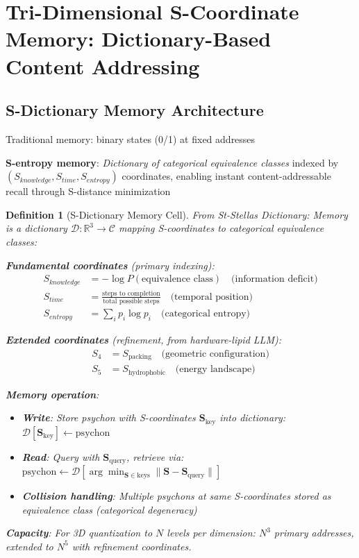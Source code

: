 \documentclass[11pt,a4paper]{article}
\newtheorem{definition}{Definition}[section]
\begin{document}
\section{Tri-Dimensional S-Coordinate Memory: Dictionary-Based Content Addressing}

\subsection{S-Dictionary Memory Architecture}

Traditional memory: binary states (0/1) at fixed addresses

\textbf{S-entropy memory}: \textit{Dictionary of categorical equivalence classes} indexed by $(S_{knowledge}, S_{time}, S_{entropy})$ coordinates, enabling instant content-addressable recall through S-distance minimization

\begin{definition}[S-Dictionary Memory Cell]
From St-Stellas Dictionary\cite{stellas_dictionary}: Memory is a dictionary $\mathcal{D}: \mathbb{R}^3 \rightarrow \mathcal{C}$ mapping S-coordinates to categorical equivalence classes:

\textbf{Fundamental coordinates} (primary indexing):
\begin{align}
S_{knowledge} &= -\log P(\text{equivalence class}) \quad \text{(information deficit)} \\
S_{time} &= \frac{\text{steps to completion}}{\text{total possible steps}} \quad \text{(temporal position)} \\
S_{entropy} &= \sum_{i} p_i \log p_i \quad \text{(categorical entropy)}
\end{align}

\textbf{Extended coordinates} (refinement, from hardware-lipid LLM):
\begin{align}
S_4 &= S_{\text{packing}} \quad \text{(geometric configuration)} \\
S_5 &= S_{\text{hydrophobic}} \quad \text{(energy landscape)}
\end{align}

\textbf{Memory operation}:
\begin{itemize}
\item \textbf{Write}: Store psychon with S-coordinates $\mathbf{S}_{\text{key}}$ into dictionary: $\mathcal{D}[\mathbf{S}_{\text{key}}] \leftarrow \text{psychon}$
\item \textbf{Read}: Query with $\mathbf{S}_{\text{query}}$, retrieve via: $\text{psychon} \leftarrow \mathcal{D}[\arg\min_{\mathbf{S} \in \text{keys}} \|\mathbf{S} - \mathbf{S}_{\text{query}}\|]$
\item \textbf{Collision handling}: Multiple psychons at same S-coordinates stored as equivalence class (categorical degeneracy)
\end{itemize}

\textbf{Capacity}: For 3D quantization to $N$ levels per dimension: $N^3$ primary addresses, extended to $N^5$ with refinement coordinates.
\end{definition}
\end{document}
